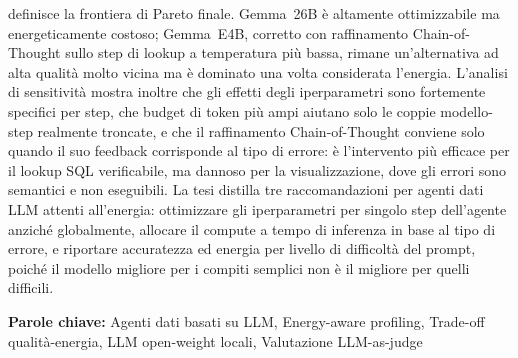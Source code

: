 definisce la frontiera di Pareto finale. Gemma~26B è altamente ottimizzabile ma energeticamente
costoso; Gemma~E4B, corretto con raffinamento Chain-of-Thought sullo step di lookup a temperatura
più bassa, rimane un'alternativa ad alta qualità molto vicina ma è dominato una volta considerata
l'energia. L'analisi di sensitività mostra
inoltre che gli effetti degli iperparametri sono fortemente specifici per step, che budget di
token più ampi aiutano solo le coppie modello-step realmente troncate, e che il raffinamento
Chain-of-Thought conviene solo quando il suo feedback corrisponde al tipo di errore: è
l'intervento più efficace per il lookup SQL verificabile, ma dannoso per la visualizzazione, dove
gli errori sono semantici e non eseguibili. La tesi distilla tre raccomandazioni per agenti dati
LLM attenti all'energia: ottimizzare gli iperparametri per singolo step dell'agente anziché
globalmente, allocare il compute a tempo di inferenza in base al tipo di errore, e riportare
accuratezza ed energia per livello di difficoltà del prompt, poiché il modello migliore per i
compiti semplici non è il migliore per quelli difficili.
\vspace{15pt}
\begin{tcolorbox}[arc=0pt, boxrule=0pt, colback=bluePoli!60, width=\textwidth, colupper=white]
    \textbf{Parole chiave:} Agenti dati basati su LLM, Energy-aware profiling, Trade-off qualità-energia, LLM open-weight locali, Valutazione LLM-as-judge
\end{tcolorbox}
